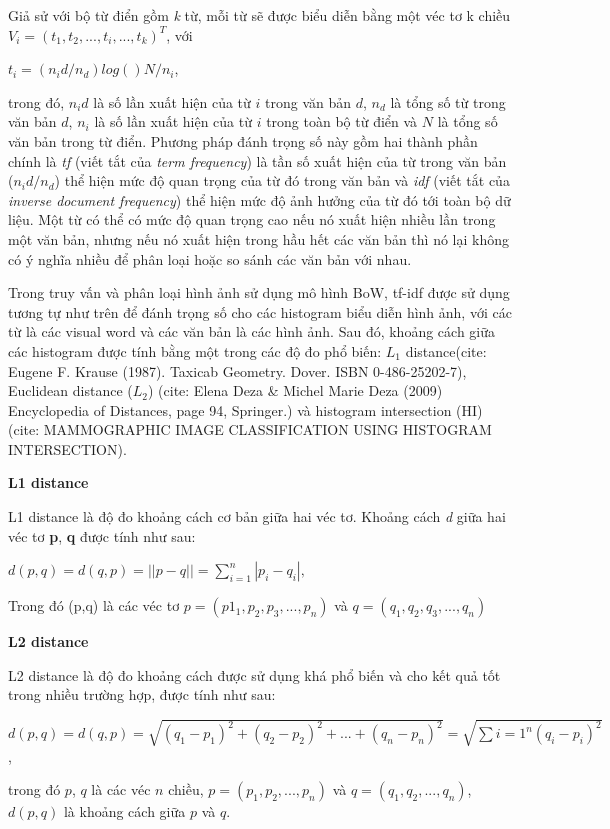 Giả sử với bộ từ điển gồm \textit{k} từ, mỗi từ sẽ được biểu diễn bằng một véc tơ k chiều $V_i = (t_1, t_2, ..., t_i, ..., t_k)^T$, với 

$t_i = (n_id/n_d)log()N/n_i$,

trong đó, $n_id$ là số lần xuất hiện của từ $i$ trong văn bản $d$, $n_d$ là tổng số từ trong văn bản $d$, $n_i$ là số lần xuất hiện của từ $i$ trong toàn bộ từ điển và $N$ là tổng số văn bản trong từ điển. Phương pháp đánh trọng số này gồm hai thành phần chính là \textit{tf} (viết tắt của \textit{term frequency}) là tần số xuất hiện của từ trong văn bản ($n_id/n_d$) thể hiện mức độ quan trọng của từ đó trong văn bản và \textit{idf} (viết tắt của \textit{inverse document frequency}) thể hiện mức độ ảnh hưởng của từ đó tới toàn bộ dữ liệu. Một từ có thể có mức độ quan trọng cao nếu nó xuất hiện nhiều lần trong một văn bản, nhưng nếu nó xuất hiện trong hầu hết các văn bản thì nó lại không có ý nghĩa nhiều để phân loại hoặc so sánh các văn bản với nhau.

Trong truy vấn và phân loại hình ảnh sử dụng mô hình BoW, tf-idf được sử dụng tương tự như trên để đánh trọng số cho các histogram biểu diễn hình ảnh, với các từ là các visual word và các văn bản là các hình ảnh. Sau đó, khoảng cách giữa các histogram được tính bằng một trong các độ đo phổ biến: $L_1$ distance(cite: Eugene F. Krause (1987). Taxicab Geometry. Dover. ISBN 0-486-25202-7), Euclidean distance ($L_2$) (cite: Elena Deza & Michel Marie Deza (2009) Encyclopedia of Distances, page 94, Springer.) và histogram intersection (HI) (cite: MAMMOGRAPHIC IMAGE CLASSIFICATION USING HISTOGRAM INTERSECTION).

\textbf{L1 distance}

L1 distance là độ đo khoảng cách cơ bản giữa hai véc tơ. Khoảng cách \textit{d} giữa hai véc tơ \textbf{p}, \textbf{q} được tính như sau:

$d(p,q) = d(q,p) = ||p-q|| = \sum\limits_{i=1}^n |p_i - q_i|,$

Trong đó (p,q) là các véc tơ $p = (p1_1, p_2, p_3, ..., p_n)$ và $q = (q_1, q_2, q_3, ..., q_n)$

\textbf{L2 distance}

L2 distance là độ đo khoảng cách được sử dụng khá phổ biến và cho kết quả tốt trong nhiều trường hợp, được tính như sau:

$d(p,q) = d(q,p) = \sqrt{(q_1-p_1)^2 + (q_2-p_2)^2 + ... + (q_n-p_n)^2} = \sqrt{\sum\limits{i=1}^n (q_i - p_i)^2}$,

trong đó $p$, $q$ là các véc $n$ chiều, $p = (p_1, p_2, ..., p_n)$ và $q = (q_1, q_2, ..., q_n)$, $d(p,q)$ là khoảng cách giữa $p$ và $q$.

